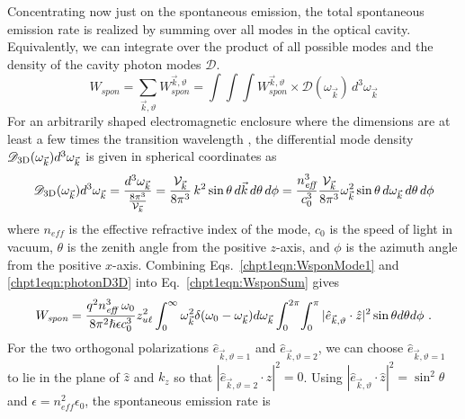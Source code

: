 \documentclass[12pt]{report}
\begin{document}
Concentrating now just on the spontaneous emission, the total spontaneous emission rate is realized by summing over all modes in the optical cavity.  Equivalently, we can integrate over the product of all possible modes and the density of the cavity photon modes $\mathscr{D}$.
\begin{equation}
\label{chpt1eqn:WsponSum}
W_\textit{spon}=\sum_{\vec{k},\vartheta} W_\textit{spon}^{\vec{k},\vartheta} = \int \! \int \!\int W_\textit{spon}^{\vec{k},\vartheta} \times \mathscr{D}(\omega_{\vec{k}}) \, d^3 \omega_{\vec{k}}
\end{equation}
For an arbitrarily shaped electromagnetic enclosure where the dimensions are at least a few times the transition wavelength \cite{Smet:JAP:1996}, the differential mode density $\mathscr{D}_{\textnormal{3D}}(\omega_{\vec{k}}) d^3\omega_{\vec{k}}$ is given in spherical coordinates as \cite{SalehTeich:book:1991}%
\begin{equation}
\label{chpt1eqn:photonD3D}
\mathscr{D}_{\textnormal{3D}}(\omega_{\vec{k}}) d^3\omega_{\vec{k}} = \frac{d^3\omega_{\vec{k}}}{\frac{8 \pi^3}{\mathcal{V}_{\vec{k}}}} = \frac{\mathcal{V}_{\vec{k}}}{8 \pi^3} \, k^2 \sin \theta \, d\vec{k} \, d\theta \, d\phi = \frac{n_\textit{eff}^3}{c_0^3} \frac{\mathcal{V}_{\vec{k}}}{8 \pi^3} \omega_{\vec{k}}^2 \sin\theta \, d\omega_{\vec{k}} \, d\theta \, d\phi
\end{equation}
where $n_\textit{eff}$ is the effective refractive index of the mode, $c_0$ is the speed of light in vacuum, $\theta$ is the zenith angle from the positive $z$-axis, and $\phi$ is the azimuth angle from the positive $x$-axis. Combining Eqs.~\eqref{chpt1eqn:WsponMode1} and \eqref{chpt1eqn:photonD3D} into Eq.~\eqref{chpt1eqn:WsponSum} gives
\begin{equation}
W_\textit{spon}=\frac{q^2 n_\textit{eff}^3 \;\omega_0}{8 \pi^2 \hslash \epsilon c_0^3} z_{u\ell}^2 \int_0^\infty \omega_{\vec{k}}^2 \delta(\omega_0 - \omega_{\vec{k}}) d\omega_{\vec{k}} \int_0^{2\pi}\!\int_0^{\pi}|\hat{e}_{\vec{k},\vartheta} \cdot \hat{z}|^2 \sin \theta d\theta d\phi \textnormal{~.}
\end{equation}
For the two orthogonal polarizations $\hat{e}_{\vec{k},\vartheta=1}$ and $\hat{e}_{\vec{k},\vartheta=2}$, we can choose $\hat{e}_{\vec{k},\vartheta=1}$ to lie in the plane of $\hat{z}$ and $k_z$ so that $|\hat{e}_{\vec{k},\vartheta=2}\cdot \hat{z}|^2=0$.  Using $|\hat{e}_{\vec{k},\vartheta} \cdot \hat{z}|^2=\sin^2\theta$ and $\epsilon=n_\textit{eff}^2 \epsilon_0$, the spontaneous emission rate is \cite{Yariv:book:1989} \cite{Parker:book:2005} \cite{Smet:JAP:1996}  \cite{Rosencher:book:2002}
\end{document}
